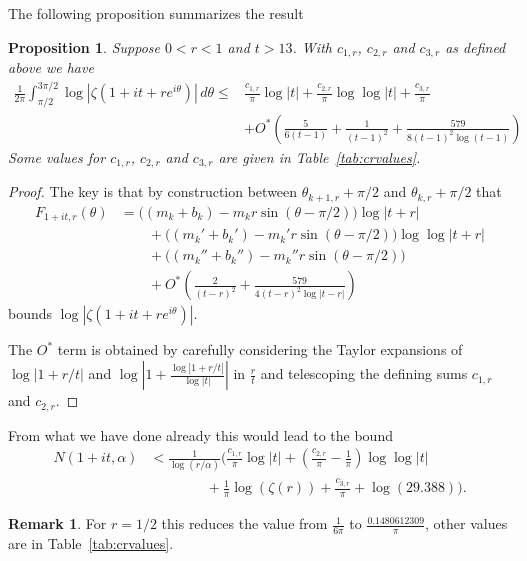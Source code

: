 \documentclass[10pt,english,letter, reqno]{amsart}
\newcommand{\Ostar}{O^{\ast}}
\theoremstyle{plain}
\newtheorem{proposition}[theorem]{Proposition}
\theoremstyle{definition}
\newtheorem{remark}[theorem]{Remark}
\begin{document}
The following proposition summarizes the result
\begin{proposition}\label{prop:jensen-easy}
    Suppose  $0<r<1$ and $t>13$. With $c_{1,r}$, $c_{2,r}$ and $c_{3,r}$ as defined above we have
    \begin{align*} \frac{1}{2\pi}\int_{ \pi/2}^{3\pi/2} \log|\zeta(1+it+re^{i\theta})|\,d\theta
    \leq& \frac{c_{1,r}}{\pi}\log|t|  + \frac{c_{2,r}}{\pi}\log\log|t| + \frac{c_{3,r}}{\pi}  \\& +\Ostar\!\left(\frac{5}{6(t-1)} + \frac{1}{(t-1)^2} + \frac{579}{8(t-1)^2\log(t-1)}\right)
    \end{align*}
    Some values for $c_{1,r}$, $c_{2,r}$ and $c_{3,r}$ are given in Table~\ref{tab:crvalues}.
\end{proposition}
\begin{proof}
   The key is that by construction between $\theta_{k+1,r}+\pi/2$ and $\theta_{k,r}+\pi/2$ that
   \begin{align*} F_{1+it,r}(\theta) &= \bigl((m_k+b_k)-m_kr\sin(\theta-\pi/2)\bigr)\log|t+r| \\&\qquad+ \bigl((m_k'+b_k')-m_k'r\sin(\theta-\pi/2)\bigr)\log\log|t+r|
   \\&\qquad+ \bigl((m_k''+b_k'')-m_k''r\sin(\theta-\pi/2)\bigr)
   \\&\qquad + \Ostar\!\left(\frac{2}{(t-r)^2} + \frac{579}{4(t-r)^2\log|t-r|}\right)
   \end{align*}
   bounds $\log|\zeta(1+ it +re^{i\theta})|$.
   
      
   The $\Ostar$ term is obtained by carefully considering the Taylor expansions of $\log|1+r/t|$ and $\log\left|1+\frac{\log|1+r/t|}{\log|t|}\right|$ in $\frac{r}{t}$ and telescoping the defining sums $c_{1,r}$ and $c_{2,r}$. 
\end{proof}
From what we have done already this would lead to the bound
    \begin{align*} N(1+it,\alpha) &< \frac{1}{\log(r/\alpha)}\Biggl( \frac{c_{1,r}}{\pi}\log|t| + \left(\frac{c_{2,r}}{\pi}-\frac{1}{\pi}\right)\log\log|t|
    \\& \qquad\qquad + \frac{1}{\pi}\log(\zeta(r)) + \frac{c_{3,r}}{\pi} +  \log(29.388) \Biggr).
    \end{align*}

    
\begin{remark}
For $r=1/2$ this reduces the value from $\frac{1}{6\pi}$ to $\frac{0.1480612309}{\pi}$, other values are in Table~\ref{tab:crvalues}.
\end{remark}
\end{document}

